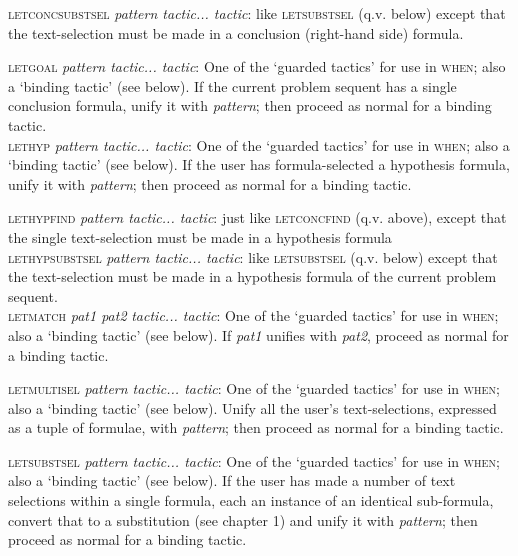 \textsc{letconcsubstsel} \textit{pattern tactic... tactic}: like \textsc{letsubstsel} (q.v. below) except that the text-selection must be made in a conclusion (right-hand side) formula.


\textsc{letgoal} \textit{pattern tactic... tactic}: One of the `guarded tactics' for use in \textsc{when}; also a `binding tactic' (see below). If the current problem sequent has a single conclusion formula, unify it with \textit{pattern}; then proceed as normal for a binding tactic.\\
\textsc{lethyp} \textit{pattern tactic... tactic}: One of the `guarded tactics' for use in \textsc{when}; also a `binding tactic' (see below). If the user has formula-selected a hypothesis formula, unify it with \textit{pattern}; then proceed as normal for a binding tactic.


\textsc{lethypfind} \textit{pattern tactic... tactic}: just like \textsc{letconcfind} (q.v. above), except that the single text-selection must be made in a hypothesis formula\\
\textsc{lethypsubstsel} \textit{pattern tactic... tactic}: like \textsc{letsubstsel} (q.v. below) except that the text-selection must be made in a hypothesis formula of the current problem sequent.\\
\textsc{letmatch} \textit{pat1 pat2} \textit{tactic... tactic}: One of the `guarded tactics' for use in \textsc{when}; also a `binding tactic' (see below). If \textit{pat1} unifies with \textit{pat2}, proceed as normal for a binding tactic.


\textsc{letmultisel} \textit{pattern tactic... tactic}: One of the `guarded tactics' for use in \textsc{when}; also a `binding tactic' (see below). Unify all the user's text-selections, expressed as a tuple of formulae, with \textit{pattern}; then proceed as normal for a binding tactic.


\textsc{letsubstsel} \textit{pattern tactic... tactic}: One of the `guarded tactics' for use in \textsc{when}; also a `binding tactic' (see below). If the user has made a number of text selections within a single formula, each an instance of an identical sub-formula, convert that to a substitution (see chapter 1) and unify it with \textit{pattern}; then proceed as normal for a binding tactic.



